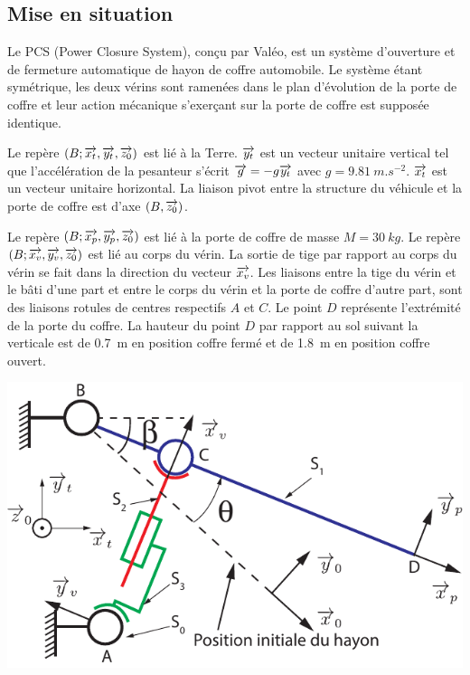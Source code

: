 \documentclass[10pt,fleqn]{article} %
\begin{document}

\vspace{4.5cm}
\pagestyle{fancy}
\thispagestyle{plain}


\def\columnseprulecolor{\color{ocre}}
\setlength{\columnseprule}{0.4pt} 

\ifprof
\else
\begin{multicols}{2}
\fi
\section*{Mise en situation}
Le PCS (Power Closure System), conçu par Valéo, est un système d’ouverture et de fermeture automatique de
hayon de coffre automobile.
Le système étant symétrique, les deux vérins sont ramenées dans 
le plan d’évolution de la porte de coffre et leur action mécanique s’exerçant sur la porte de coffre est supposée identique.

Le repère $\left(B;\overrightarrow{x_t},\overrightarrow{y_t},\overrightarrow{z_0} \right)$ est lié à la Terre. $\overrightarrow{y_t}$ est un vecteur unitaire vertical tel que l’accélération de la pesanteur s’écrit $\overrightarrow{g}=-g\overrightarrow{y_t}$ avec $g=\SI{9,81}{m.s^{-2}}$. $\overrightarrow{x_t}$ est un vecteur unitaire horizontal. La liaison pivot entre
la structure du véhicule et la porte de coffre est d’axe $\left(B,\overrightarrow{z_0}\right)$.

Le repère $\left(B;\overrightarrow{x_p},\overrightarrow{y_p},\overrightarrow{z_0} \right)$ est lié à la porte de coffre de masse $M=\SI{30}{kg}$. Le repère $\left(B;\overrightarrow{x_v},\overrightarrow{y_v},\overrightarrow{z_0} \right)$ est lié au corps du vérin. La sortie
de tige par rapport au corps du vérin se fait dans la direction du vecteur $\overrightarrow{x_v}$.
Les liaisons entre la tige du vérin et le bâti d’une part et entre le corps du vérin et la porte de coffre d’autre part, sont des liaisons rotules de centres respectifs $A$ et $C$.
Le point $D$ représente l’extrémité de la porte du coffre. La hauteur du point $D$ par rapport au sol suivant la
verticale est de \SI{0,7}{m} en position coffre fermé et de \SI{1,8}{m} en position coffre ouvert.
\begin{center}
\includegraphics[width=.8\linewidth]{images/hayon_parametrage}
\end{center}



\end{multicols}
\end{document}
